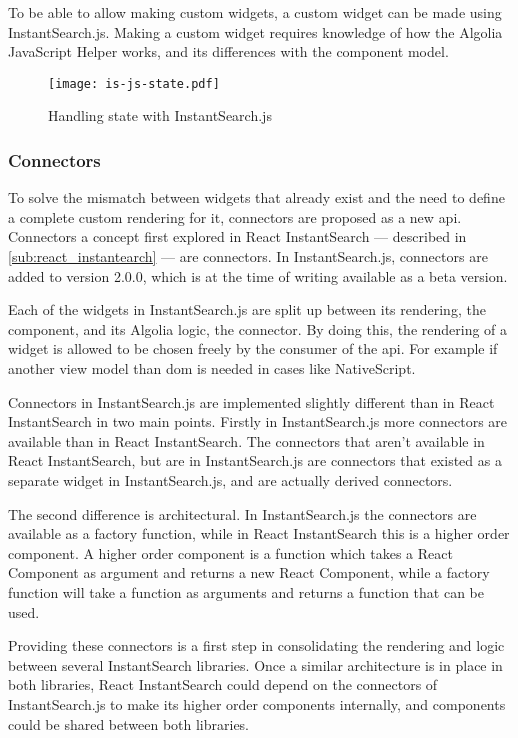 To be able to allow making custom widgets, a custom widget can be made using InstantSearch.js. Making a custom widget requires knowledge of how the Algolia JavaScript Helper works, and its differences with the component model.

\begin{figure}[H]
  \centering
  \texttt{[image: is-js-state.pdf]}
  \caption{Handling state with InstantSearch.js}
  \label{figure:is-js-state}
\end{figure}

\subsubsection{Connectors} %
\label{ssub:instantsearch_js_connectors}

To solve the mismatch between widgets that already exist and the need to define a complete custom rendering for it, connectors are proposed as a new \acrshort{api}. Connectors a concept first explored in React InstantSearch --- described in \ref{sub:react_instantearch} --- are connectors. In InstantSearch.js, connectors are added to version 2.0.0, which is at the time of writing available as a beta version.

Each of the widgets in InstantSearch.js are split up between its rendering, the component, and its Algolia logic, the connector. By doing this, the rendering of a widget is allowed to be chosen freely by the consumer of the \acrshort{api}. For example if another view model than \acrshort{dom} is needed in cases like NativeScript. 

Connectors in InstantSearch.js are implemented slightly different than in React InstantSearch in two main points. Firstly in InstantSearch.js more connectors are available than in React InstantSearch. The connectors that aren't available in React InstantSearch, but are in InstantSearch.js are connectors that existed as a separate widget in InstantSearch.js, and are actually derived connectors.

The second difference is architectural. In InstantSearch.js the connectors are available as a factory function, while in React InstantSearch this is a higher order component. A higher order component is a function which takes a React Component as argument and returns a new React Component, while a factory function will take a function as arguments and returns a function that can be used.

Providing these connectors is a first step in consolidating the rendering and logic between several InstantSearch libraries. Once a similar architecture is in place in both libraries, React InstantSearch could depend on the connectors of InstantSearch.js to make its higher order components internally, and components could be shared between both libraries.

